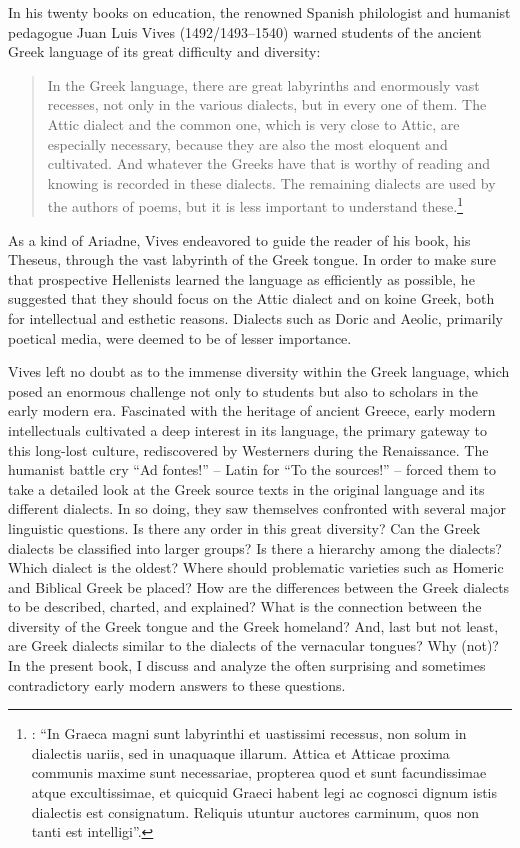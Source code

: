 \addchap{\lsPrefaceTitle} 

In his twenty books on education, the renowned Spanish philologist and humanist pedagogue Juan Luis Vives (1492/1493–1540) warned students of the ancient Greek language of its great difficulty and diversity:

\begin{quote}
In the Greek language, there are great labyrinths and enormously vast recesses, not only in the various dialects, but in every one of them. The Attic dialect and the common one, which is very close to Attic, are especially necessary, because they are also the most eloquent and cultivated. And whatever the Greeks have that is worthy of reading and knowing is recorded in these dialects. The remaining dialects are used by the authors of poems, but it is less important to understand these.\footnote{\citet[e3\textsuperscript{v}]{Vives1531}: “In Graeca magni sunt labyrinthi et uastissimi recessus, non solum in dialectis uariis, sed in unaquaque illarum. Attica et Atticae proxima communis maxime sunt necessariae, propterea quod et sunt facundissimae atque excultissimae, et quicquid Graeci habent legi ac cognosci dignum istis dialectis est consignatum. Reliquis utuntur auctores carminum, quos non tanti est intelligi”.}
\end{quote}

As a kind of Ariadne, Vives endeavored to guide the reader of his book, his Theseus, through the vast labyrinth of the Greek tongue. In order to make sure that prospective Hellenists learned the language as efficiently as possible, he suggested that they should focus on the Attic dialect and on koine Greek, both for intellectual and esthetic reasons. Dialects such as Doric and Aeolic, primarily poetical media, were deemed to be of lesser importance.

Vives left no doubt as to the immense diversity within the Greek language, which posed an enormous challenge not only to students but also to scholars in the early modern era. Fascinated with the heritage of ancient Greece, early modern intellectuals cultivated a deep interest in its language, the primary gateway to this long-lost culture, rediscovered by Westerners during the Renaissance. The humanist battle cry “Ad fontes!” – Latin for “To the sources!” – forced them to take a detailed look at the Greek source texts in the original language and its different dialects. In so doing, they saw themselves confronted with several major linguistic questions. Is there any order in this great diversity? Can the Greek dialects be classified into larger groups? Is there a hierarchy among the dialects? Which dialect is the oldest? Where should problematic varieties such as Homeric and Biblical Greek be placed? How are the differences between the Greek dialects to be described, charted, and explained? What is the connection between the diversity of the Greek tongue and the Greek homeland? And, last but not least, are Greek dialects similar to the dialects of the vernacular tongues? Why (not)? In the present book, I discuss and analyze the often surprising and sometimes contradictory early modern answers to these questions.
